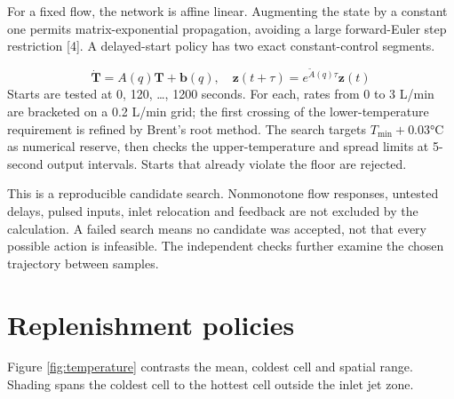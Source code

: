 \documentclass[12pt,a4paper]{article}
\begin{document}
For a fixed flow, the network is affine linear. Augmenting the state by a constant one permits matrix-exponential propagation, avoiding a large forward-Euler step restriction [4]. A delayed-start policy has two exact constant-control segments.

\begin{equation}\dot{\mathbf{T}}=A(q)\mathbf{T}+\mathbf{b}(q),\quad \mathbf{z}(t+\tau)=e^{\widetilde{A}(q)\tau}\mathbf{z}(t)\end{equation}
Starts are tested at 0, 120, …, 1200 seconds. For each, rates from 0 to 3 L/min are bracketed on a 0.2 L/min grid; the first crossing of the lower-temperature requirement is refined by Brent’s root method. The search targets $T_{\min}+0.03$°C as numerical reserve, then checks the upper-temperature and spread limits at 5-second output intervals. Starts that already violate the floor are rejected.

This is a reproducible candidate search. Nonmonotone flow responses, untested delays, pulsed inputs, inlet relocation and feedback are not excluded by the calculation. A failed search means no candidate was accepted, not that every possible action is infeasible. The independent checks further examine the chosen trajectory between samples.

\section{Replenishment policies}
Figure \ref{fig:temperature} contrasts the mean, coldest cell and spatial range. Shading spans the coldest cell to the hottest cell outside the inlet jet zone.
\end{document}
